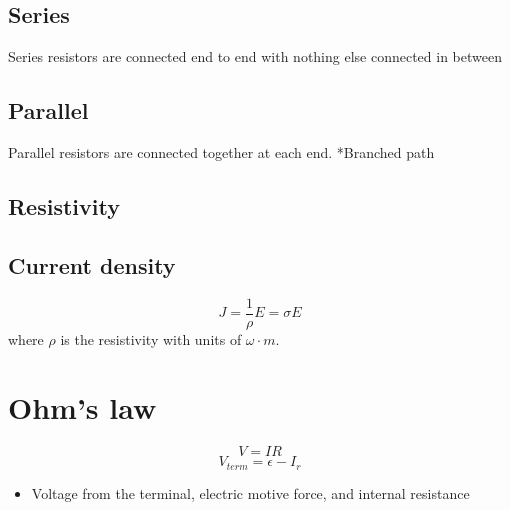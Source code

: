 \documentclass[a4paper,12pt]{article}
\begin{document}
        \subsection*{Series}
            Series resistors are connected end to end with nothing else connected in between
        \subsection*{Parallel}
            Parallel resistors are connected together at each end. *Branched path

        \subsection*{Resistivity} 

        \subsection*{Current density}
            \[J=\frac{1}{\rho}E=\sigma E\]where
             $\rho$ is the resistivity with units of $\omega \cdot m$. 
             

    \section*{Ohm's law}
        \[V=IR\]
        \[V_{term}=\epsilon-I_r\]
        \begin{itemize}
            \item Voltage from the terminal, electric motive force, and internal resistance
        \end{itemize}
\end{document}

